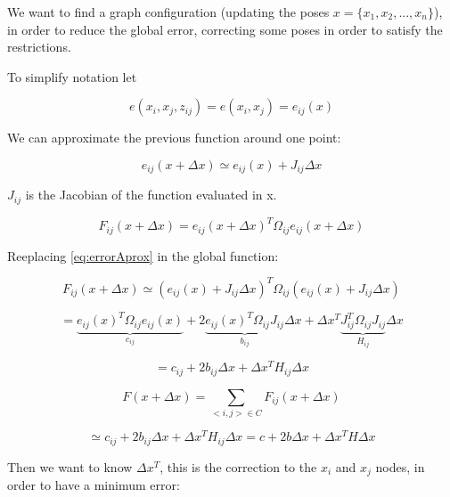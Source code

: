 We want to find a graph configuration (updating the poses $x=\{x_1,x_2,...,x_n\}$), in order to reduce 
the global error, correcting some poses in order to satisfy the restrictions.

To simplify notation let 

$$
e(x_i,x_j,z_{ij}) = e(x_i,x_j) = e_{ij}(x)
$$

We can approximate the previous function around one point:

\begin{equation}
\label{eq:errorAprox}
e_{ij}(x + \Delta x) \simeq e_{ij}(x) + J_{ij} \Delta x
\end{equation}

$J_{ij}$ is the Jacobian of the function evaluated in x. 


\begin{equation}
\label{eq:globalFunc}
F_{ij}(x + \Delta x) = e_{ij}(x + \Delta x)^T \Omega_{ij}  e_{ij}(x + \Delta x)
\end{equation}

Reeplacing \ref{eq:errorAprox} in the global function:

\begin{equation}
\label{eq:globalFuncAprox}
F_{ij}(x + \Delta x) \simeq (e_{ij}(x) + J_{ij} \Delta x)^T \Omega_{ij}  (e_{ij}(x) + J_{ij} \Delta x)
\end{equation}

\begin{equation}
\label{eq:globalFuncAprox2}
 =  \underbrace{e_{ij}(x)^T \Omega_{ij} e_{ij}(x)}_{c_{ij}} + 2  \underbrace{e_{ij}(x)^T \Omega_{ij} J_{ij}}_{b_{ij}} \Delta x + \Delta x^T \underbrace{ J_{ij}^T  \Omega_{ij} J_{ij}}_{H_{ij}} \Delta x
\end{equation}

\begin{equation}
\label{eq:globalFuncAprox2}
 = c_{ij} + 2 b_{ij} \Delta x + \Delta x^T H_{ij} \Delta x
\end{equation}


\begin{equation}
F(x + \Delta x) =  \sum\limits_{<i,j> \in C } F_{ij}(x + \Delta x) 
\end{equation}



\begin{equation}
\simeq  c_{ij} + 2 b_{ij} \Delta x + \Delta x^T H_{ij} \Delta x
=   c + 2 b \Delta x + \Delta x^T H \Delta x
\end{equation}

Then we want to know $\Delta x^T$, this is the correction to the $x_i$ and $x_j$ nodes, in order 
to have a minimum error:

